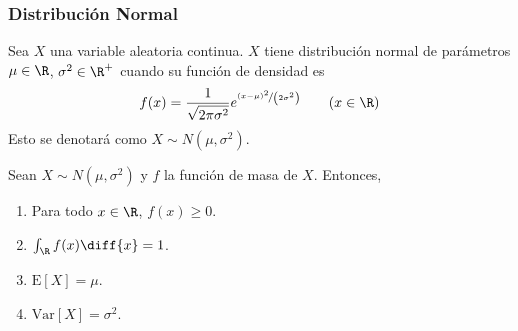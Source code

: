 \subsubsection{Distribución Normal}
\begin{Def}
  Sea $X$ una variable aleatoria continua. $X$ tiene distribución normal
  de parámetros $\mu\in\R$, $\sigma^2\in\R^+$ cuando su función de densidad es
  \[
    f(x) = \dfrac{1}{\sqrt{2\pi\sigma^2}}
    e^{\nicefrac{(x-\mu)^2}{\left(2\sigma^2\right)}}
    \qquad (x\in\R)
  \]
  Esto se denotará como $X\sim N(\mu,\sigma^2)$.
\end{Def}
\begin{Teo}
  Sean $X\sim N(\mu,\sigma^2)$ y $f$ la función de masa de $X$. Entonces,
  \begin{enumerate}
    \item Para todo $x\in\R$, $f(x) \geq 0$.
    \item $\int_{\R}{f(x)}\diff{x} = 1$.
    \item $\text{E}[X] = \mu$.
    \item $\text{Var}[X] = \sigma^2$.
  \end{enumerate}
\end{Teo}

